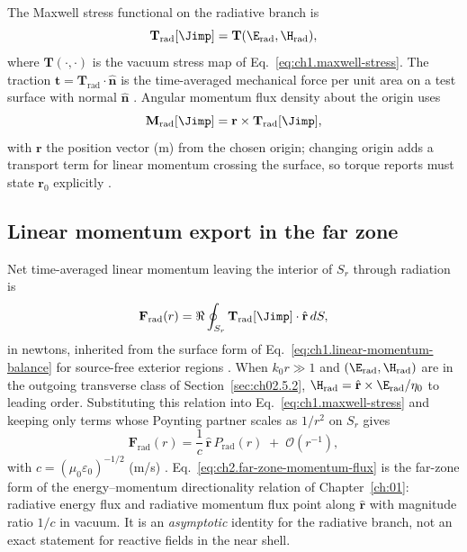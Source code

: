 The Maxwell stress functional on the radiative branch is
\begin{equation}
\label{eq:ch2.stress-functional-radiative}
\mathbf{T}_{\mathrm{rad}}[\Jimp]
=
\mathbf{T}(\E_{\mathrm{rad}},\H_{\mathrm{rad}}),
\end{equation}
where $\mathbf{T}(\cdot,\cdot)$ is the vacuum stress map of Eq.~\eqref{eq:ch1.maxwell-stress}. The traction $\mathbf{t}=\mathbf{T}_{\mathrm{rad}}\cdot\hat{\mathbf{n}}$ is the time-averaged mechanical force per unit area on a test surface with normal $\hat{\mathbf{n}}$ \cite{maxwell1873,stratton1941}. Angular momentum flux density about the origin uses
\begin{equation}
\label{eq:ch2.angular-flux-density}
\mathbf{M}_{\mathrm{rad}}[\Jimp]
=
\mathbf{r}\times\mathbf{T}_{\mathrm{rad}}[\Jimp],
\end{equation}
with $\mathbf{r}$ the position vector (m) from the chosen origin; changing origin adds a transport term for linear momentum crossing the surface, so torque reports must state $\mathbf{r}_0$ explicitly \cite{stratton1941,beth1936}.

\subsection{Linear momentum export in the far zone}
\label{sec:ch02.5b.2}

Net time-averaged linear momentum leaving the interior of $S_r$ through radiation is
\begin{equation}
\label{eq:ch2.momentum-flux-functional}
\mathbf{F}_{\mathrm{rad}}(r)
=
\Re\oint_{S_r}\mathbf{T}_{\mathrm{rad}}[\Jimp]\cdot\hat{\mathbf{r}}\,dS,
\end{equation}
in newtons, inherited from the surface form of Eq.~\eqref{eq:ch1.linear-momentum-balance} for source-free exterior regions \cite{maxwell1873,stratton1941}. When $k_0 r\gg1$ and $(\E_{\mathrm{rad}},\H_{\mathrm{rad}})$ are in the outgoing transverse class of Section~\ref{sec:ch02.5.2}, $\H_{\mathrm{rad}}=\hat{\mathbf{r}}\times\E_{\mathrm{rad}}/\eta_0$ to leading order. Substituting this relation into Eq.~\eqref{eq:ch1.maxwell-stress} and keeping only terms whose Poynting partner scales as $1/r^2$ on $S_r$ gives
\begin{equation}
\label{eq:ch2.far-zone-momentum-flux}
\mathbf{F}_{\mathrm{rad}}(r)
=
\frac{1}{c}\,\hat{\mathbf{r}}\,P_{\mathrm{rad}}(r)
\;+\;\mathcal{O}(r^{-1}),
\end{equation}
with $c=(\mu_0\varepsilon_0)^{-1/2}$ (m/s) \cite{stratton1941,jackson1999}. Eq.~\eqref{eq:ch2.far-zone-momentum-flux} is the far-zone form of the energy--momentum directionality relation of Chapter~\ref{ch:01}: radiative energy flux and radiative momentum flux point along $\hat{\mathbf{r}}$ with magnitude ratio $1/c$ in vacuum. It is an \emph{asymptotic} identity for the radiative branch, not an exact statement for reactive fields in the near shell.

